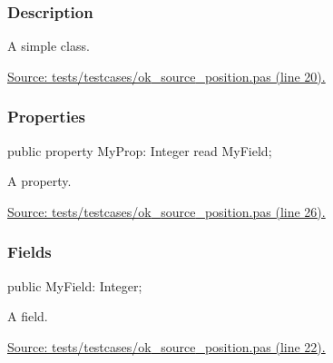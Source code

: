 \documentclass{report}
\newif\ifpdf
\begin{document}
\subsubsection*{\large{\textbf{Description}}\normalsize\hspace{1ex}\hfill}
A simple class.\par
\href{https://github.com/pasdoc/pasdoc/blob/master/tests/testcases/ok_source_position.pas#L20}{Source: tests/testcases/ok{\_}source{\_}position.pas (line 20).}\subsubsection*{\large{\textbf{Properties}}\normalsize\hspace{1ex}\hfill}
\begin{list}{}{
\setlength{\itemindent}{0cm}
\setlength{\listparindent}{0cm}
\setlength{\leftmargin}{\evensidemargin}
\addtolength{\leftmargin}{\tmplength}
\settowidth{\labelsep}{X}
\addtolength{\leftmargin}{\labelsep}
\setlength{\labelwidth}{\tmplength}
}
\label{ok_source_position.TMyClass-MyProp}
\item[\textbf{MyProp}\hfill]
\ifpdf
\begin{flushleft}
\fi
\begin{ttfamily}
public property MyProp: Integer read MyField;\end{ttfamily}

\ifpdf
\end{flushleft}
\fi


\par A property.\par
\href{https://github.com/pasdoc/pasdoc/blob/master/tests/testcases/ok_source_position.pas#L26}{Source: tests/testcases/ok{\_}source{\_}position.pas (line 26).}\end{list}
\subsubsection*{\large{\textbf{Fields}}\normalsize\hspace{1ex}\hfill}
\begin{list}{}{
\setlength{\itemindent}{0cm}
\setlength{\listparindent}{0cm}
\setlength{\leftmargin}{\evensidemargin}
\addtolength{\leftmargin}{\tmplength}
\settowidth{\labelsep}{X}
\addtolength{\leftmargin}{\labelsep}
\setlength{\labelwidth}{\tmplength}
}
\label{ok_source_position.TMyClass-MyField}
\item[\textbf{MyField}\hfill]
\ifpdf
\begin{flushleft}
\fi
\begin{ttfamily}
public MyField: Integer;\end{ttfamily}

\ifpdf
\end{flushleft}
\fi


\par A field.\par
\href{https://github.com/pasdoc/pasdoc/blob/master/tests/testcases/ok_source_position.pas#L22}{Source: tests/testcases/ok{\_}source{\_}position.pas (line 22).}\end{list}
\end{document}
